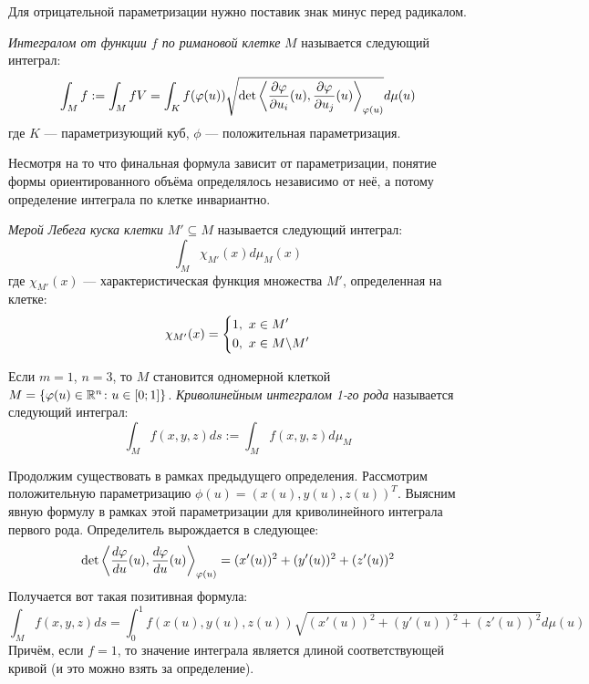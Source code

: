 \begin{note}
	Для отрицательной параметризации нужно поставик знак минус перед радикалом.
\end{note}

\begin{definition}
	\textit{Интегралом от функции $f$ по римановой клетке} $M$ называется следующий интеграл:
	\[
		\int_M f := \int_M fV = \int_K f(\varphi(u))\sqrt{\det\left\langle\frac{\partial \varphi}{\partial u_i}(u), \frac{\partial \varphi}{\partial u_j}(u)\right\rangle_{\varphi(u)}}d\mu(u)
	\]
	где $K$ --- параметризующий куб, $\phi$ --- положительная параметризация.
\end{definition}

\begin{note}
	Несмотря на то что финальная формула зависит от параметризации, понятие формы ориентированного объёма определялось независимо от неё, а потому определение интеграла по клетке инвариантно.
\end{note}

\begin{definition}
	\textit{Мерой Лебега куска клетки} $M' \subseteq M$ называется следующий интеграл:
	\[
		\int_M \chi_{M'}(x)d\mu_M(x)
	\]
	где $\chi_{M'}(x)$ --- характеристическая функция множества $M'$, определенная на клетке:
	\[
		\chi_{M'}(x) = \left\{ \begin{aligned} 
			&{1,\ x \in M'}
			\\
			&{0,\ x \in M \backslash M'}
		 \end{aligned} \right.
	\]
\end{definition}

\begin{definition}
	Если $m = 1$, $n = 3$, то $M$ становится одномерной клеткой $M = \{\varphi(u) \in \mathbb{R}^n \colon u \in [0; 1]\}$. \textit{Криволинейным интегралом 1-го рода} называется следующий интеграл:
	\[
		\int_M f(x, y, z)ds := \int_M f(x, y, z)d\mu_M
	\]
\end{definition}

\begin{note}
	Продолжим существовать в рамках предыдущего определения. Рассмотрим положительную параметризацию $\phi(u) = (x(u), y(u), z(u))^T$. Выясним явную формулу в рамках этой параметризации для криволинейного интеграла первого рода. Определитель вырождается в следующее:
	\[
		\det\left\langle\frac{d\varphi}{du}(u), \frac{d\varphi}{du}(u)\right\rangle_{\varphi(u)} = (x'(u))^2 + (y'(u))^2 + (z'(u))^2
	\]
	Получается вот такая позитивная формула:
	\[
		\int_M f(x, y, z)ds = \int_0^1 f(x(u), y(u), z(u))\sqrt{(x'(u))^2 + (y'(u))^2 + (z'(u))^2}d\mu(u)
	\]
	Причём, если $f = 1$, то значение интеграла является длиной соответствующей кривой (и это можно взять за определение).
\end{note}

